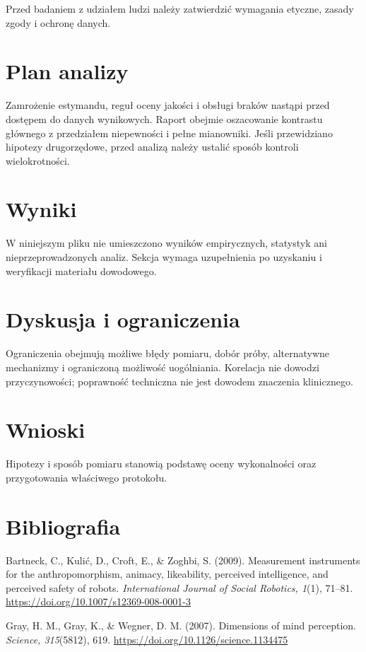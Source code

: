 \documentclass[11pt,a4paper]{article}
\begin{document}
Przed badaniem z udziałem ludzi należy zatwierdzić wymagania etyczne, zasady zgody i ochronę danych.

\section{Plan analizy}

Zamrożenie estymandu, reguł oceny jakości i obsługi braków nastąpi przed dostępem do danych wynikowych. Raport obejmie oszacowanie kontrastu głównego z przedziałem niepewności i pełne mianowniki. Jeśli przewidziano hipotezy drugorzędowe, przed analizą należy ustalić sposób kontroli wielokrotności.

\section{Wyniki}

W niniejszym pliku nie umieszczono wyników empirycznych, statystyk ani nieprzeprowadzonych analiz. Sekcja wymaga uzupełnienia po uzyskaniu i weryfikacji materiału dowodowego.

\section{Dyskusja i ograniczenia}

Ograniczenia obejmują możliwe błędy pomiaru, dobór próby, alternatywne mechanizmy i ograniczoną możliwość uogólniania. Korelacja nie dowodzi przyczynowości; poprawność techniczna nie jest dowodem znaczenia klinicznego.

\section{Wnioski}

Hipotezy i sposób pomiaru stanowią podstawę oceny wykonalności oraz przygotowania właściwego protokołu.

\section*{Bibliografia}

{\setlength{\parindent}{0pt}
\setlength{\parskip}{5pt}
\hangindent=1.27cm
Bartneck, C., Kulić, D., Croft, E., \& Zoghbi, S. (2009). Measurement instruments for the anthropomorphism, animacy, likeability, perceived intelligence, and perceived safety of robots. \textit{International Journal of Social Robotics, 1}(1), 71--81. \url{https://doi.org/10.1007/s12369-008-0001-3}\par
\hangindent=1.27cm
Gray, H. M., Gray, K., \& Wegner, D. M. (2007). Dimensions of mind perception. \textit{Science, 315}(5812), 619. \url{https://doi.org/10.1126/science.1134475}\par
}
\end{document}
